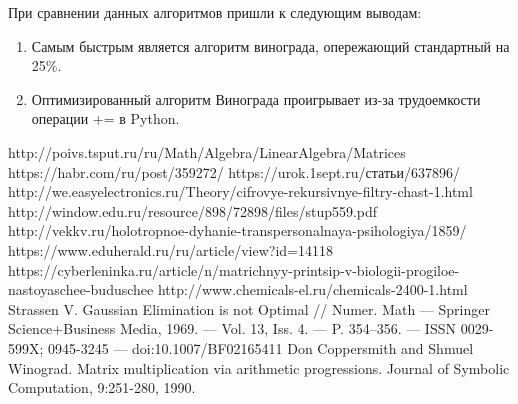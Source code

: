 \documentclass[a4paper,14pt]{article} %
\begin{document}
	\hfill
	
	При сравнении данных алгоритмов пришли к следующим выводам:
	\begin{enumerate}
 		\item Самым быстрым  является алгоритм винограда, опережающий стандартный на 25\%. 
 		\item Оптимизированный алгоритм Винограда проигрывает из-за трудоемкости операции += в Python. 
	\end{enumerate}
        

 	\newpage

        \begin{thebibliography}{}
        		\bibitem{} http://poivs.tsput.ru/ru/Math/Algebra/LinearAlgebra/Matrices
		\bibitem{} https://habr.com/ru/post/359272/
		\bibitem{} https://urok.1sept.ru/статьи/637896/
		\bibitem{} http://we.easyelectronics.ru/Theory/cifrovye-rekursivnye-filtry-chast-1.html
		\bibitem{} http://window.edu.ru/resource/898/72898/files/stup559.pdf
		\bibitem{} http://vekkv.ru/holotropnoe-dyhanie-transpersonalnaya-psihologiya/1859/
		\bibitem{} https://www.eduherald.ru/ru/article/view?id=14118
		\bibitem{} https://cyberleninka.ru/article/n/matrichnyy-printsip-v-biologii-progiloe-nastoyaschee-buduschee
		\bibitem{} http://www.chemicals-el.ru/chemicals-2400-1.html
		\bibitem{} Strassen V. Gaussian Elimination is not Optimal // Numer. Math — Springer Science+Business Media, 1969. — Vol. 13, Iss. 4. — P. 354–356. — ISSN 0029-599X; 0945-3245 — doi:10.1007/BF02165411
		\bibitem{} Don Coppersmith and Shmuel Winograd. Matrix multiplication via arithmetic progressions. Journal of Symbolic Computation, 9:251-280, 1990.
	\end{thebibliography} 
\end{document}
